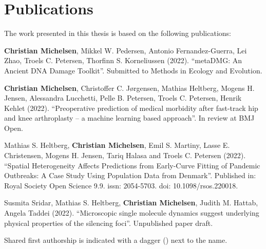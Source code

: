 \chapter{Publications}

The work presented in this thesis is based on the following publications:

\vspace{2cm}

\begin{description} [labelindent=1cm,style=multiline,leftmargin=3cm]
	\item [Paper 1:] \textbf{Christian Michelsen}\textsuperscript{\textdagger}, Mikkel W. Pedersen\textsuperscript{\textdagger}, Antonio Fernandez-Guerra, Lei Zhao, Troels C. Petersen, Thorfinn S. Korneliussen (2022). ``metaDMG: An Ancient DNA Damage Toolkit''. Submitted to Methods in Ecology and Evolution. \\
	\item [Paper 2:] \textbf{Christian Michelsen}\textsuperscript{\textdagger}, Christoffer C. Jørgensen\textsuperscript{\textdagger}, Mathias Heltberg, Mogens H. Jensen, Alessandra Lucchetti, Pelle B. Petersen, Troels C. Petersen, Henrik Kehlet (2022). ``Preoperative prediction of medical morbidity after fast-track hip and knee arthroplasty -- a machine learning based approach''. In review at BMJ Open. \\
	\item [Paper 3:] Mathias S. Heltberg\textsuperscript{\textdagger}, \textbf{Christian Michelsen}\textsuperscript{\textdagger}, Emil S. Martiny, Lasse E. Christensen, Mogens H. Jensen, Tariq Halasa and Troels C. Petersen (2022). ``Spatial Heterogeneity Affects Predictions from Early-Curve Fitting of Pandemic Outbreaks: A Case Study Using Population Data from Denmark''. Published in: Royal Society Open Science 9.9. issn: 2054-5703. doi: 10.1098/rsos.220018.  \\
	\item [Paper 4:] Susmita Sridar\textsuperscript{\textdagger}, Mathias S. Heltberg\textsuperscript{\textdagger}, \textbf{Christian Michelsen}\textsuperscript{\textdagger}, Judith M. Hattab, Angela Taddei (2022). ``Microscopic single molecule dynamics suggest underlying physical properties of the silencing foci''. Unpublished paper draft.
\end{description}


\vspace{1cm}
\noindent Shared first authorship is indicated with a dagger (\textdagger) next to the name.


